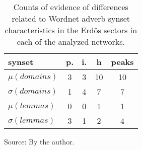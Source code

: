 \begin{table}[h!]
\begin{center}
\caption{Counts of evidence of differences related to Wordnet adverb synset characteristics in the Erd\"os sectors in each of the analyzed networks.}
\begin{tabular}{l || c | c | c || c}\hline
{\bf synset} & {\bf p.} & {\bf i.} & {\bf h} & {\bf peaks} \\\hline\hline
$\mu(domains)$ & 3  & 3  & 10  & 10 \\
$\sigma(domains)$ & 1  & 4  & 7  & 7 \\\hline
$\mu(lemmas)$ & 0  & 0  & 1  & 1 \\
$\sigma(lemmas)$ & 3  & 1  & 2  & 4 \\\hline
\end{tabular}
\begin{flushleft}\footnotesize
		Source: By the author.\
\end{flushleft}
\end{center}
\end{table}

